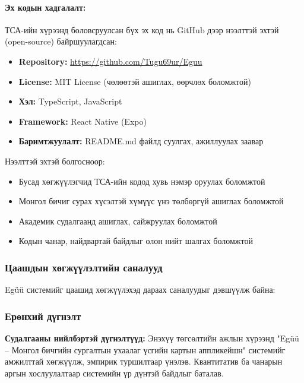 \paragraph{Эх кодын хадгалалт:}

ТСА-ийн хүрээнд боловсруулсан бүх эх код нь GitHub дээр нээлттэй эхтэй (open-source) байршуулагдсан:

\begin{itemize}
    \item \textbf{Repository:} \url{https://github.com/Tugu69ur/Eguu}
    \item \textbf{License:} MIT License (чөлөөтэй ашиглах, өөрчлөх боломжтой)
    \item \textbf{Хэл:} TypeScript, JavaScript
    \item \textbf{Framework:} React Native (Expo)
    \item \textbf{Баримтжуулалт:} README.md файлд суулгах, ажиллуулах заавар
\end{itemize}

Нээлттэй эхтэй болгосноор:
\begin{itemize}
    \item Бусад хөгжүүлэгчид ТСА-ийн кодод хувь нэмэр оруулах боломжтой
    \item Монгол бичиг сурах хүсэлтэй хүмүүс үнэ төлбөргүй ашиглах боломжтой
    \item Академик судалгаанд ашиглах, сайжруулах боломжтой
    \item Кодын чанар, найдвартай байдлыг олон нийт шалгах боломжтой
\end{itemize}

\subsubsection{Цаашдын хөгжүүлэлтийн саналууд}
\label{subsec:future-work}

Egüü системийг цаашид хөгжүүлэхэд дараах саналуудыг дэвшүүлж байна:





\subsubsection{Ерөнхий дүгнэлт}
\label{subsec:general-conclusion}

\textbf{Судалгааны нийлбэртэй дүгнэлтүүд:} Энэхүү төгсөлтийн ажлын хүрээнд "Egüü – Монгол бичгийн сургалтын ухаалаг үсгийн картын аппликейшн" системийг амжилттай хөгжүүлж, эмпирик туршилтаар үнэлэв. Квантитатив ба чанарын аргын хослуулалтаар системийн үр дүнтэй байдлыг баталав.


